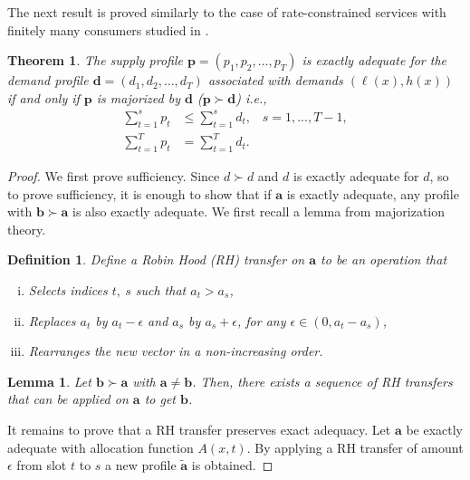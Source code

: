 \documentclass[10pt,draftcls,onecolumn]{IEEEtran}
\newtheorem{theorem}{Theorem}
\newtheorem{definition}{Definition}
\newtheorem{lemma}{Lemma}
\let \VEC \mathbf
\let \morethan \succ
\newcounter{l1}
\newcounter{l2}
\newcounter{l3}
\begin{document}
The next result is proved similarly to  the case of rate-constrained services with finitely many consumers studied in \cite{dd2013}.
\begin{theorem}\label{thm:cont_adequacy}
The supply profile  $\VEC p=(p_1,p_2,\ldots,p_T)$ is exactly adequate for the demand profile  $ \VEC d=(d_1,d_2,\ldots,d_T)$ associated with demands $(\ell(x),h(x))$  if and only if $\VEC p$ is majorized by $\VEC d$ ($\VEC p \morethan \VEC d$) i.e., 
\begin{align}
\sum_{t=1}^s p_t &\leq \sum_{t=1}^s d_t,\;\;\;s=1,...,T-1 ,\label{a1}\\
\sum_{t=1}^T p_t &= \sum_{t=1}^T d_t . \label{a2}
\end{align}
\end{theorem}
\begin{proof}
We first prove sufficiency.
Since $d \morethan d$ and $d$ is exactly adequate for $d$, so to prove sufficiency, it is enough to show  that if $\VEC a$ is exactly adequate, any  profile with $\VEC b \morethan \VEC a$ is also exactly adequate.  We first recall a  lemma from majorization theory.
\begin{definition}
Define a \textit{Robin Hood (RH)} transfer on $\VEC a$ to be an operation that
\begin{enumerate}[(i)]
\item Selects indices $t,~s$ such that $a_t > a_s$,
\item Replaces $a_t$ by $a_t - \epsilon$ and $a_s$ by $a_s+\epsilon$, for any $\epsilon \in (0,a_t-a_s)$,
\item Rearranges the new vector in a non-increasing order.
\end{enumerate}
\end{definition}
\begin{lemma}  \cite{arnold}
Let $\VEC b \morethan \VEC a$ with $\VEC a \neq \VEC b$. Then, there exists a sequence of RH transfers that can be applied on $\VEC a$ to get $\VEC b$. 
\end{lemma}

It remains to prove that a RH transfer preserves exact adequacy. Let $\VEC a$  be exactly adequate  with allocation function $A(x,t)$. By applying a RH transfer of amount $\epsilon$ from slot $t$ to $s$ a new profile $\VEC{\tilde{a}}$ is obtained. 


\end{proof}
\end{document}
